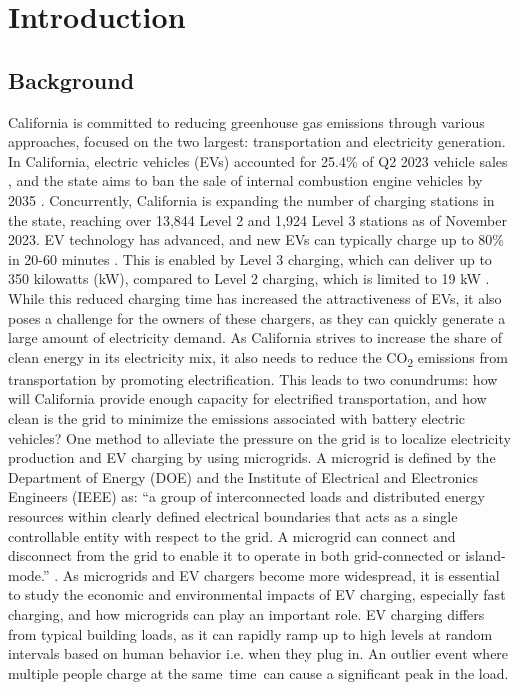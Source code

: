 \documentclass[conference]{IEEEtran}
\begin{document}
\section{Introduction}
    \subsection{Background}
		California is committed to reducing greenhouse gas emissions through various approaches, focused on the two largest: transportation and electricity generation.  In California, electric vehicles (EVs) accounted for 25.4\% of Q2 2023 vehicle sales \cite{ev_sale_percentage}, and the state aims to ban the sale of internal combustion engine vehicles by 2035 \cite{ice_ban}. Concurrently, California is expanding the number of charging stations in the state, reaching over 13,844 Level 2 and 1,924 Level 3 stations \cite{ev_stations_CA} as of November 2023. EV technology has advanced, and new EVs can typically charge up to 80\% in 20-60 minutes \cite{ev_stats}. This is enabled by Level 3 charging, which can deliver up to 350 kilowatts (kW), compared to Level 2 charging, which is limited to 19 kW \cite{ev_stats}. While this reduced charging time has increased the attractiveness of EVs, it also poses a challenge for the owners of these chargers, as they can quickly generate a large amount of electricity demand. As California strives to increase the share of clean energy in its electricity mix, it also needs to reduce the CO\textsubscript{2} emissions from transportation by promoting electrification. This leads to two conundrums: how will California provide enough capacity for electrified transportation, and how clean is the grid to minimize the emissions associated with battery electric vehicles? One method to alleviate the pressure on the grid is to localize electricity production and EV charging by using microgrids. A microgrid is defined by the Department of Energy (DOE) and the Institute of Electrical and Electronics Engineers (IEEE) as: “a group of interconnected loads and distributed energy resources within clearly defined electrical boundaries that acts as a single controllable entity with respect to the grid. A microgrid can connect and disconnect from the grid to enable it to operate in both grid-connected or island-mode.” \cite{microgrid_def} \cite{microgrid_def_ieee}. As microgrids and EV chargers become more widespread, it is essential to study the economic and environmental impacts of EV charging, especially fast charging, and how microgrids can play an important role. EV charging differs from typical building loads, as it can rapidly ramp up to high levels at random intervals based on human behavior i.e. when they plug in. An outlier event where multiple people charge at the same time can cause a significant peak in the load. 
		
\end{document}
